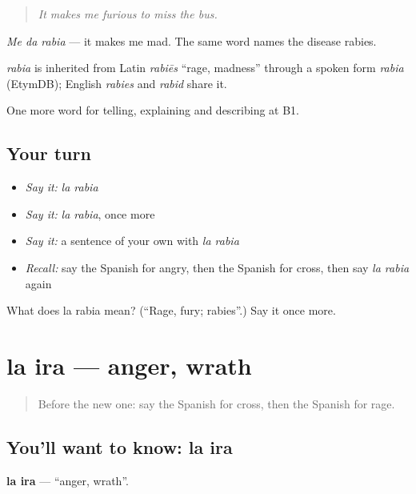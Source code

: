 \begin{quote}
\emph{It makes me furious to miss the bus.}
\end{quote}

\emph{Me da rabia} — it makes me mad. The same word names the disease rabies.

\begin{cousinweb}
\emph{rabia} is inherited from Latin \emph{rabiēs} \textquotedblleft{}rage, madness\textquotedblright{} through a spoken form \emph{rabia} (EtymDB); English \emph{rabies} and \emph{rabid} share it.
\end{cousinweb}

\begin{grammarlens}[title={What you've built}]
One more word for telling, explaining and describing at B1.
\end{grammarlens}

\subsection*{Your turn}
\begin{itemize}
\raggedright
  \item \emph{Say it:} \emph{la rabia}
  \item \emph{Say it:} \emph{la rabia}, once more
  \item \emph{Say it:} a sentence of your own with \emph{la rabia}
  \item \emph{Recall:} say the Spanish for angry, then the Spanish for cross, then say \emph{la rabia} again
\end{itemize}

\begin{tcolorbox}[breakable,colback=teal!4,colframe=teal!35!black,title={Before you move on}]
What does la rabia mean? (\textquotedblleft{}Rage, fury; rabies\textquotedblright{}.) Say it once more.
\end{tcolorbox}
\section[la ira]{la ira — anger, wrath}

\label{lesson:ES-C707-ira}



\begin{quote}
Before the new one: say the Spanish for cross, then the Spanish for rage.
\end{quote}

\subsection*{You'll want to know: la ira}
\textbf{la ira} — \textquotedblleft{}anger, wrath\textquotedblright{}.

